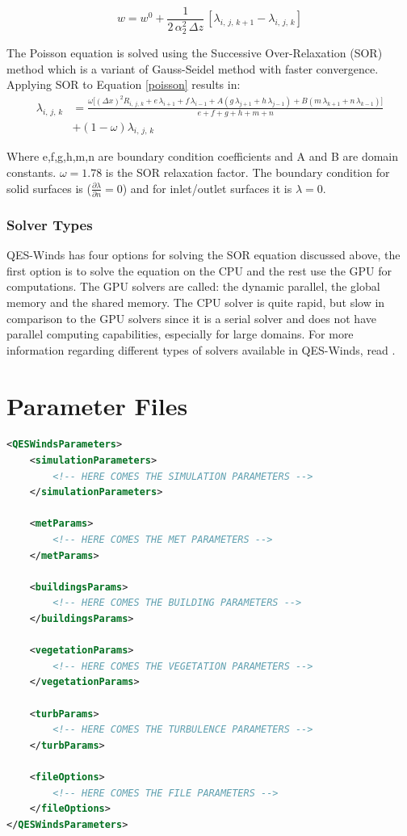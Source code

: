 \begin{equation}
\label{eu-lag3}
 w = w^0 + \frac{1}{2\,\alpha_2^2\,\Delta z}\,[\lambda_{i,\,j,\,k+1}-\lambda_{i,\,j,\,k}]
\end{equation}

The Poisson equation is solved using the Successive Over-Relaxation (SOR) method which is a variant of Gauss-Seidel method with faster convergence. Applying SOR to Equation \ref{poisson} results in:
\begin{equation}
\label{SOR}
\begin{split}
 \lambda_{i,\,j,\,k} & = \frac{\omega\Bigg[(\Delta x)^2 R_{i,\,j,\,k}+e\,\lambda_{i+1}+f\, \lambda_{i-1}+A(g\,\lambda_{j+1}+h\, \lambda_{j-1}) + B(m\,\lambda_{k+1}+n\, \lambda_{k-1})\Bigg]}{e+f+g+h+m+n}\\
 & +(1-\omega)\lambda_{i,\,j,\,k}
 \end{split}
\end{equation}

Where e,f,g,h,m,n are boundary condition coefficients and A and B are domain constants. $\omega = 1.78$ is the SOR relaxation factor. The boundary condition for solid surfaces is ($\frac{\partial \lambda}{\partial n}=0$) and for inlet/outlet surfaces it is $\lambda=0$.


\subsubsection{Solver Types}

QES-Winds has four options for solving the SOR equation discussed above, the first option is to solve the equation on the CPU and the rest use the GPU for computations. The GPU solvers are called: the dynamic parallel, the global memory and the shared memory. The CPU solver is quite rapid, but slow in comparison to the GPU solvers since it is a serial solver and does not have parallel computing capabilities, especially for large domains. For more information regarding different types of solvers available in QES-Winds, read \cite{Bozorgmehr2021}.

\section{Parameter Files}

\begin{lstlisting}[language=XML]
<QESWindsParameters>
	<simulationParameters>
		<!-- HERE COMES THE SIMULATION PARAMETERS -->
	</simulationParameters>
		
	<metParams>
		<!-- HERE COMES THE MET PARAMETERS -->
	</metParams>
	
	<buildingsParams>
		<!-- HERE COMES THE BUILDING PARAMETERS -->
	</buildingsParams>

	<vegetationParams>
		<!-- HERE COMES THE VEGETATION PARAMETERS -->
	</vegetationParams>	
	
	<turbParams>
		<!-- HERE COMES THE TURBULENCE PARAMETERS -->
	</turbParams>							
	
	<fileOptions>
		<!-- HERE COMES THE FILE PARAMETERS -->
	</fileOptions>
</QESWindsParameters>
\end{lstlisting}


